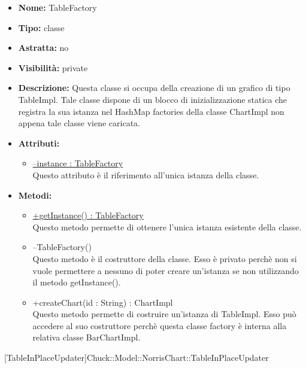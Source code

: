 			
			\begin{itemize}
			\item \textbf{Nome:} TableFactory
			\item \textbf{Tipo:} classe
			
		\item \textbf{Astratta:}
		no
			\item \textbf{Visibilità:} private
			\item \textbf{Descrizione:} Questa classe si occupa della creazione di un grafico di tipo TableImpl. Tale classe dispone di un blocco di inizializzazione statica che registra la sua istanza nel HashMap factories della classe ChartImpl non appena tale classe viene caricata.
			\item \textbf{Attributi:}
				\begin{itemize}
				\setlength{\itemsep}{5pt}
				
					\item[\ding{111}] \underline{--instance : TableFactory} \\ [1mm] Questo attributo è il riferimento all'unica istanza della classe.
				\end{itemize}
		
			\item \textbf{Metodi:}
				\begin{itemize}
				\setlength{\itemsep}{5pt}
				
					\item[\ding{111}] {\underline{+getInstance() : TableFactory}} \\ [1mm] Questo metodo permette di ottenere l'unica istanza esistente della classe.
					\item[\ding{111}] {{--TableFactory()}} \\ [1mm] Questo metodo è il costruttore della classe. Esso è privato perchè non si vuole permettere a nessuno di poter creare un’istanza se non utilizzando il metodo getInstance().
					\item[\ding{111}] {{+createChart(id : String) : ChartImpl}} \\ [1mm] Questo metodo permette di costruire un'istanza di TableImpl. Esso può accedere al suo costruttore perchè questa classe factory è interna alla relativa classe BarChartImpl.
				\end{itemize}
		
			\end{itemize}

			
			[TableInPlaceUpdater]{Chuck::Model::NorrisChart::TableInPlaceUpdater}
			

